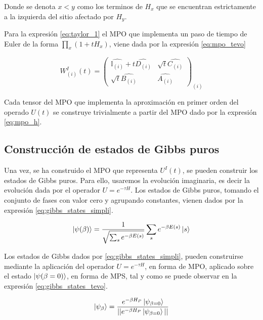 Donde se denota $x<y$ como los terminos de $H_x$ que se encuentran estrictamente a la izquierda del sitio afectado por $H_y$. 

\newpage

Para la expresión \ref{eq:taylor_1} el MPO que implementa un paso de tiempo de Euler de la forma $\prod_{x}(1 + t H_{x})$, viene dada por la expresión \ref{eq:mpo_tevo}


\begin{equation}
W^{I}_{(i)}(t) =
\begin{pmatrix}
\hat{\mathbb{I}_{(i)}} + t \hat{D_{(i)}} & \sqrt{t}\hat{C_{(i)}} \\
 \sqrt{t}\hat{B_{(i)}} & \hat{A_{(i)}} 
\end{pmatrix}_{(i)}
\label{eq:mpo_tevo}
\end{equation}

Cada tensor del MPO que implementa la aproximación en primer orden del operado $U(t)$ se construye trivialmente a partir del MPO dado por la expresión \ref{eq:mpo_h}. 

\subsection{Construcción de estados de Gibbs puros}

Una vez, se ha construido el MPO que representa $U^{I}(t)$, se pueden construir los estados de Gibbs puros. Para ello, usaremos la evolución imaginaria, es decir la evolución dada por el operador $U = e^{- \tau H}$. Los estados de Gibbs puros, tomando el conjunto de fases con valor cero y agrupando constantes, vienen dados por la expresión \ref{eq:gibbs_states_simpli}.

\begin{equation}
    \ket{\psi(\beta)}=\frac{1}{\sqrt{\sum_s e^{-\beta E(s)}}}\sum_s e^{- \beta E(s)}\ket{s}
    \label{eq:gibbs_states_simpli}
\end{equation}

Los estados de Gibbs dados por \ref{eq:gibbs_states_simpli}, pueden construirse mediante la aplicación del operador $U = e^{- \tau H}$, en forma de MPO, aplicado sobre el estado $\ket{\psi(\beta=0)}$, en forma de MPS, tal y como se puede observar en la expresión \ref{eq:gibbs_states_tevo}.

\begin{equation}
\ket{\psi_\beta}= \frac{e^{-\beta H_P}\ket{\psi_{\beta=0}}}{|| e^{-\beta H_P}\ket{\psi_{\beta=0}}||}   
\label{eq:gibbs_states_tevo}
\end{equation}

